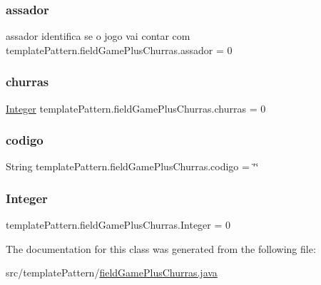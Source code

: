 \subsubsection{\texorpdfstring{assador}{assador}}
{\footnotesize\ttfamily assador identifica se o jogo vai contar com template\+Pattern.\+field\+Game\+Plus\+Churras.\+assador = 0}

\mbox{\label{classtemplate_pattern_1_1field_game_plus_churras_a444f7af83374a53ba00ad27233d46eb1}} 
\subsubsection{\texorpdfstring{churras}{churras}}
{\footnotesize\ttfamily \mbox{\hyperlink{classtemplate_pattern_1_1field_game_plus_churras_a6cbc62aaae4b80f652e3cf99a8c366b1}{Integer}} template\+Pattern.\+field\+Game\+Plus\+Churras.\+churras = 0}

\mbox{\label{classtemplate_pattern_1_1field_game_plus_churras_ae3b9de6846f9c658dea25ee719dde3ea}} 
\subsubsection{\texorpdfstring{codigo}{codigo}}
{\footnotesize\ttfamily String template\+Pattern.\+field\+Game\+Plus\+Churras.\+codigo = \char`\"{}\char`\"{}}

\mbox{\label{classtemplate_pattern_1_1field_game_plus_churras_a6cbc62aaae4b80f652e3cf99a8c366b1}} 
\subsubsection{\texorpdfstring{Integer}{Integer}}
{\footnotesize\ttfamily template\+Pattern.\+field\+Game\+Plus\+Churras.\+Integer = 0}



The documentation for this class was generated from the following file\+:\begin{DoxyCompactItemize}
\item 
src/template\+Pattern/\mbox{\hyperlink{field_game_plus_churras_8java}{field\+Game\+Plus\+Churras.\+java}}\end{DoxyCompactItemize}
